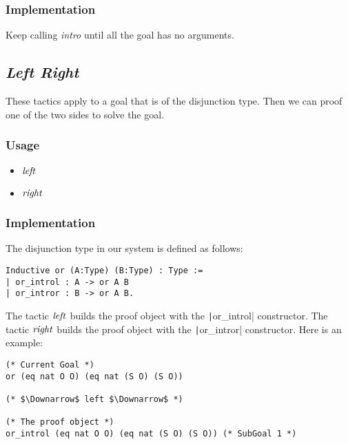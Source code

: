 \subsubsection*{Implementation}
Keep calling {\it intro} until all the goal has no arguments.

\subsection{\it Left Right}
These tactics apply to a goal that is of the disjunction type. Then we can proof one of the two sides to solve the goal.

\subsubsection*{Usage}
\begin{itemize}
    \item ${\it left}$
    \item ${\it right}$
\end{itemize}

\subsubsection*{Implementation}
The disjunction type in our system is defined as follows:
\begin{center}
\begin{minipage}{\textwidth}
\begin{verbatim}
Inductive or (A:Type) (B:Type) : Type :=
| or_introl : A -> or A B
| or_intror : B -> or A B. 
\end{verbatim}
\end{minipage}
\end{center}

The tactic ${\it left}$ builds the proof object with the \texttt|or_introl| constructor.
The tactic ${\it right}$ builds the proof object with the \texttt|or_intror| constructor.
Here is an example:
\begin{center}
\begin{minipage}{\textwidth}
\begin{verbatim}
(* Current Goal *)
or (eq nat O O) (eq nat (S O) (S O))

(* $\Downarrow$ left $\Downarrow$ *)

(* The proof object *)
or_introl (eq nat O O) (eq nat (S O) (S O)) (* SubGoal 1 *)
\end{verbatim}
\end{minipage}
\end{center}

